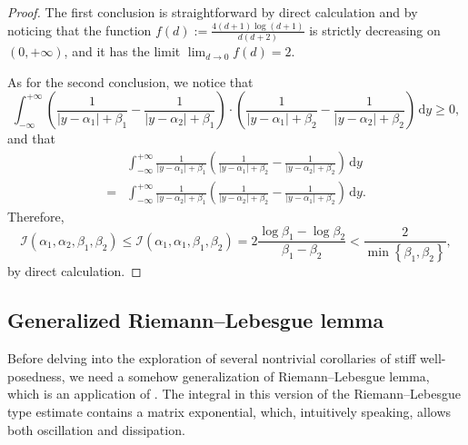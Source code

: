 \documentclass{article}
\theoremstyle{plain}%
\theoremstyle{definition}%
\theoremstyle{remark}%
\newcommand{\cI}{\mathcal{I}}
\newcommand{\rd}{\mathrm{d}}
\newcommand{\+}[1]{{\bm{#1}}}
\begin{document}
\begin{proof}
  The first conclusion is straightforward by direct calculation and 
  by noticing that the function 
  $f(d) := \frac{4 (d + 1) \log (d + 1)}{d (d + 2)}$ is strictly 
  decreasing on $(0, + \infty)$, and it has the limit 
  $\lim_{d \rightarrow 0} f(d) = 2$.

  As for the second conclusion, we notice that 
  \begin{displaymath}
    \int_{- \infty}^{+ \infty} 
    \left( \frac{1}{|y - \alpha_1| + \beta_1} 
    - \frac{1}{|y - \alpha_2| + \beta_1} \right) \cdot 
    \left( \frac{1}{|y - \alpha_1| + \beta_2} 
    - \frac{1}{|y - \alpha_2| + \beta_2} \right) \,\rd y \ge 0,
  \end{displaymath}
  and that 
  \begin{displaymath}
    \begin{aligned}
      & \int_{- \infty}^{+ \infty} \frac{1}{|y - \alpha_1| + \beta_1} 
      \left( \frac{1}{|y - \alpha_1| + \beta_2} - 
      \frac{1}{|y - \alpha_2| + \beta_2} \right) \,\rd y \\
      = & \int_{- \infty}^{+ \infty}
      \frac{1}{|y - \alpha_2| + \beta_1} 
      \left( \frac{1}{|y - \alpha_2| + \beta_2} - 
      \frac{1}{|y - \alpha_1| + \beta_2} \right) \,\rd y.
    \end{aligned}
  \end{displaymath}
  Therefore, 
  \begin{displaymath}
    \cI(\alpha_1, \alpha_2, \beta_1, \beta_2) \le 
    \cI(\alpha_1, \alpha_1, \beta_1, \beta_2) = 
    2 \frac{\log \beta_1 - \log \beta_2}{\beta_1 - \beta_2} <
    \frac{2}{\min \left\{ \beta_1, \beta_2 \right\}},
  \end{displaymath}
  by direct calculation.
\end{proof}

\subsection{Generalized Riemann--Lebesgue lemma}
Before delving into the exploration of several nontrivial corollaries 
of stiff well-posedness, we need a somehow generalization of 
Riemann--Lebesgue lemma, 
which is an application of . 
The integral in this version of the Riemann--Lebesgue type estimate 
contains a matrix exponential, which, intuitively speaking, allows 
both oscillation and dissipation.
\end{document}

